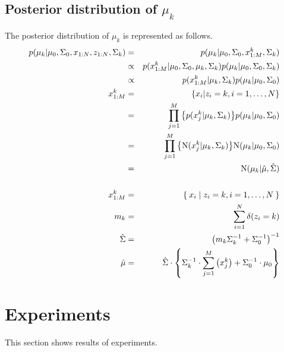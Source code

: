 \documentclass[a4paper]{article}
\begin{document}
\subsection{Posterior distribution of $\mu_k$}
The posterior distribution of $\mu_k$ is represented as follows.
\begin{eqnarray}
	p(\mu_k | \mu_0, \Sigma_0, x_{1:N}, z_{1:N}, \Sigma_k) &=& p(\mu_k | \mu_0, \Sigma_0, x^{k}_{1:M}, \Sigma_k)\\
	&\propto& p(x^{k}_{1:M} | \mu_0, \Sigma_0, \mu_k, \Sigma_k) p(\mu_k | \mu_0, \Sigma_0, \Sigma_k)\\
	&\propto& p(x^{k}_{1:M} | \mu_k, \Sigma_k) p(\mu_k | \mu_0, \Sigma_0)\\
	x^{k}_{1:M} &=& \left\{ x_i | z_i = k, i=1, \ldots, N \right\}\\
	&=& \prod_{j=1}^{M}{\left\{ p(x^{k}_{j} | \mu_k, \Sigma_k) \right\}} p(\mu_k | \mu_0, \Sigma_0)\\
	&=& \prod_{j=1}^{M}{\left\{ {\rm N}(x^{k}_{j} | \mu_k, \Sigma_k) \right\}} {\rm N}(\mu_k | \mu_0, \Sigma_0)\\
	&=& {\rm N}(\mu_k | \hat{\mu}, \hat{\Sigma})\\
	\nonumber \\
	x^{k}_{1:M} &=& \Set{ x_i | z_i = k, i=1, \ldots, N }\\
	m_k &=& \sum_{i=1}^{N}{\delta(z_i = k)}\\
	\hat{\Sigma} &=& \left( m_k \Sigma^{-1}_k + \Sigma^{-1}_0 \right)^{-1}\\
	\hat{\mu} &=& \hat{\Sigma} \cdot \left\{ \Sigma^{-1}_k \cdot \sum_{j=1}^{M}{\left( x^k_j \right) + \Sigma^{-1}_0 \cdot \mu_0} \right\}
\end{eqnarray}

\section{Experiments}
This section shows results of experiments.
\end{document}
